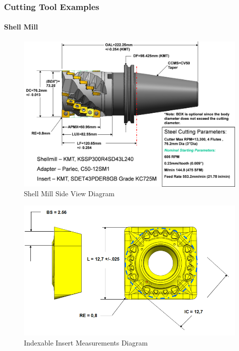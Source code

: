 \FloatBarrier


\subsubsection{Cutting Tool Examples}
\label{sec:Cutting Tool Examples}

\paragraph{Shell Mill}\mbox{}
\label{sec:Shell Mill}

\begin{figure}[ht]
  \centering
    \includegraphics[width=1.0\textwidth]{figures/Shell Mill Side View.png}
  \caption{Shell Mill Side View Diagram}
  \label{fig:Shell Mill Side View Diagram}
\end{figure}

\FloatBarrier


\begin{figure}[ht]
  \centering
    \includegraphics[width=1.0\textwidth]{figures/Indexable Insert Measurements.png}
  \caption{Indexable Insert Measurements Diagram}
  \label{fig:Indexable Insert Measurements Diagram}
\end{figure}

